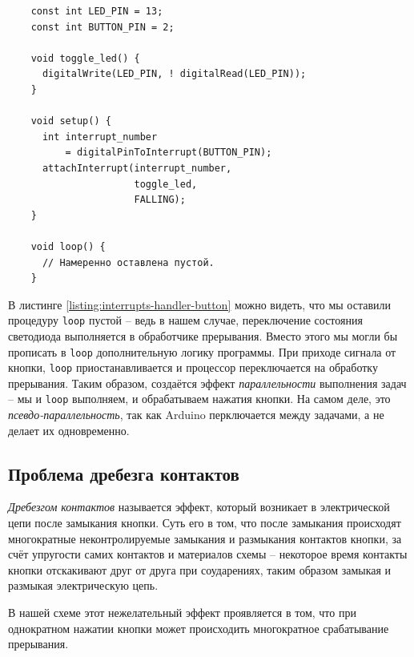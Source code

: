 \documentclass[../sparc.tex]{subfiles}
\begin{document}
\begin{listing}[H]
  \begin{verbatim}
    const int LED_PIN = 13;
    const int BUTTON_PIN = 2;

    void toggle_led() {
      digitalWrite(LED_PIN, ! digitalRead(LED_PIN));
    }

    void setup() {
      int interrupt_number
          = digitalPinToInterrupt(BUTTON_PIN);
      attachInterrupt(interrupt_number,
                      toggle_led,
                      FALLING);
    }

    void loop() {
      // Намеренно оставлена пустой.
    }
  \end{verbatim}
  \caption{Обработка прерывания от кнопки.}
  \label{listing:interrupts-handler-button}
\end{listing}

В листинге \ref{listing:interrupts-handler-button} можно видеть, что мы оставили
процедуру \texttt{loop} пустой -- ведь в нашем случае, переключение
состояния светодиода выполняется в обработчике прерывания.  Вместо этого мы
могли бы прописать в \texttt{loop} дополнительную логику программы.
При приходе сигнала от кнопки, \texttt{loop} приостанавливается и
процессор переключается на обработку прерывания.  Таким образом, создаётся
эффект \emph{параллельности} выполнения задач -- мы и \texttt{loop}
выполняем, и обрабатываем нажатия кнопки.  На самом деле, это
\emph{псевдо-параллельность}, так как Arduino перключается между задачами, а не
делает их одновременно.

\subsection{Проблема дребезга контактов}
\label{subsection:button-debounce}

\emph{Дребезгом контактов} называется эффект, который возникает в электрической
цепи после замыкания кнопки.  Суть его в том, что после замыкания происходят
многократные неконтролируемые замыкания и размыкания контактов кнопки, за счёт
упругости самих контактов и материалов схемы -- некоторое время контакты кнопки
отскакивают друг от друга при соударениях, таким образом замыкая и размыкая
электрическую цепь.

В нашей схеме этот нежелательный эффект проявляется в том, что при однократном
нажатии кнопки может происходить многократное срабатывание прерывания.
\end{document}
